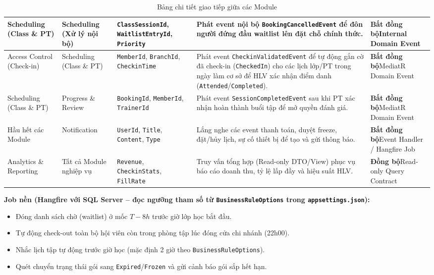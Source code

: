 \documentclass[a4paper,12pt]{article}
\begin{document}
\begin{table}[H]
\begin{tabularx}{\textwidth}{|L{2.5cm}|L{2.5cm}|L{2.8cm}|Y|L{2.8cm}|}
Scheduling (Class \& PT) & Scheduling (Xử lý nội bộ) & \texttt{ClassSessionId}, \texttt{WaitlistEntryId}, \texttt{Priority} & Phát event nội bộ \texttt{BookingCancelledEvent} để đôn người đứng đầu waitlist lên đặt chỗ chính thức. & \textbf{Bất đồng bộ}\newline Internal Domain Event \\ \hline
Access Control (Check-in) & Scheduling (Class \& PT) & \texttt{MemberId}, \texttt{BranchId}, \texttt{CheckinTime} & Phát event \texttt{CheckinValidatedEvent} để tự động gắn cờ đã check-in (\texttt{CheckedIn}) cho các lịch lớp/PT trong ngày làm cơ sở để HLV xác nhận điểm danh (\texttt{Attended}/\texttt{Completed}). & \textbf{Bất đồng bộ}\newline MediatR Domain Event \\ \hline
Scheduling (Class \& PT) & Progress \& Review & \texttt{BookingId}, \texttt{MemberId}, \texttt{TrainerId} & Phát event \texttt{SessionCompletedEvent} sau khi PT xác nhận hoàn thành buổi tập để mở quyền đánh giá. & \textbf{Bất đồng bộ}\newline MediatR Domain Event \\ \hline
Hầu hết các Module & Notification & \texttt{UserId}, \texttt{Title}, \texttt{Content}, \texttt{Type} & Lắng nghe các event thanh toán, duyệt freeze, đặt/hủy lịch, sự cố thiết bị để tạo và gửi thông báo. & \textbf{Bất đồng bộ}\newline Event Handler / Hangfire Job \\ \hline
Analytics \& Reporting & Tất cả Module nghiệp vụ & \texttt{Revenue}, \texttt{CheckinStats}, \texttt{FillRate} & Truy vấn tổng hợp (Read-only DTO/View) phục vụ báo cáo doanh thu, tỷ lệ lấp đầy và hiệu suất HLV. & \textbf{Đồng bộ}\newline Read-only Query Contract \\ \hline
\end{tabularx}
\caption{Bảng chi tiết giao tiếp giữa các Module}
\end{table}

\textbf{Job nền (Hangfire với SQL Server -- đọc ngưỡng tham số từ \texttt{BusinessRuleOptions} trong \texttt{appsettings.json}):}
\begin{itemize}
    \item Đóng danh sách chờ (waitlist) ở mốc $T-8h$ trước giờ lớp học bắt đầu.
    \item Tự động check-out toàn bộ hội viên còn trong phòng tập lúc đóng cửa chi nhánh (22h00).
    \item Nhắc lịch tập tự động trước giờ học (mặc định 2 giờ theo \texttt{BusinessRuleOptions}).
    \item Quét chuyển trạng thái gói sang \texttt{Expired}/\texttt{Frozen} và gửi cảnh báo gói sắp hết hạn.
\end{itemize}
\end{document}
